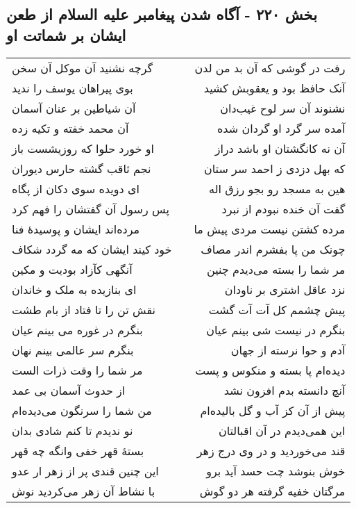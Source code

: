 \begin{center}
\section*{بخش ۲۲۰ - آگاه شدن پیغامبر علیه السلام از طعن ایشان بر شماتت او}
\label{sec:sh220}
\begin{longtable}{l p{0.5cm} r}
گرچه نشنید آن موکل آن سخن
&&
رفت در گوشی که آن بد من لدن
\\
بوی پیراهان یوسف را ندید
&&
آنک حافظ بود و یعقوبش کشید
\\
آن شیاطین بر عنان آسمان
&&
نشنوند آن سر لوح غیب‌دان
\\
آن محمد خفته و تکیه زده
&&
آمده سر گرد او گردان شده
\\
او خورد حلوا که روزیشست باز
&&
آن نه کانگشتان او باشد دراز
\\
نجم ثاقب گشته حارس دیوران
&&
که بهل دزدی ز احمد سر ستان
\\
ای دویده سوی دکان از پگاه
&&
هین به مسجد رو بجو رزق اله
\\
پس رسول آن گفتشان را فهم کرد
&&
گفت آن خنده نبودم از نبرد
\\
مرده‌اند ایشان و پوسیدهٔ فنا
&&
مرده کشتن نیست مردی پیش ما
\\
خود کیند ایشان که مه گردد شکاف
&&
چونک من پا بفشرم اندر مصاف
\\
آنگهی کآزاد بودیت و مکین
&&
مر شما را بسته می‌دیدم چنین
\\
ای بنازیده به ملک و خاندان
&&
نزد عاقل اشتری بر ناودان
\\
نقش تن را تا فتاد از بام طشت
&&
پیش چشمم کل آت آت گشت
\\
بنگرم در غوره می بینم عیان
&&
بنگرم در نیست شی بینم عیان
\\
بنگرم سر عالمی بینم نهان
&&
آدم و حوا نرسته از جهان
\\
مر شما را وقت ذرات الست
&&
دیده‌ام پا بسته و منکوس و پست
\\
از حدوث آسمان بی عمد
&&
آنچ دانسته بدم افزون نشد
\\
من شما را سرنگون می‌دیده‌ام
&&
پیش از آن کز آب و گل بالیده‌ام
\\
نو ندیدم تا کنم شادی بدان
&&
این همی‌دیدم در آن اقبالتان
\\
بستهٔ قهر خفی وانگه چه قهر
&&
قند می‌خوردید و در وی درج زهر
\\
این چنین قندی پر از زهر ار عدو
&&
خوش بنوشد چت حسد آید برو
\\
با نشاط آن زهر می‌کردید نوش
&&
مرگتان خفیه گرفته هر دو گوش
\\

\end{longtable}
\end{center}

